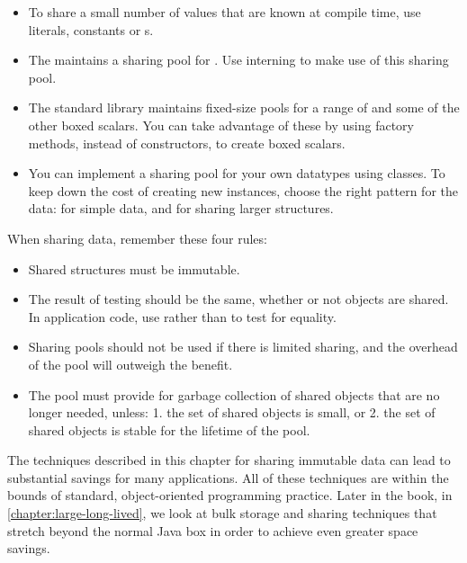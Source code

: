 \begin{itemize}
  \item To share a small number of values that are known at compile time, use
   literals,  constants or s.
  \item The \jre maintains a sharing
  pool for . Use  interning to make use of this
  sharing pool.
  \item The standard library maintains fixed-size pools for
   a range of  and some of the other boxed scalars. You
   can take advantage of these by using  factory methods, instead
   of constructors, to create boxed scalars.
   \item You can implement a sharing pool for your own datatypes using
    classes. To keep down the cost of creating new instances, choose
   the right pattern for the data:  for
   simple data, and  for sharing larger structures.
\end{itemize}

When sharing data, remember these four rules:
\begin{itemize}
  \item Shared structures must be immutable.
  \item The result of  testing should be the same, whether or
not objects are shared. In application code, use  rather than
\code{==} to test for equality.
  \item Sharing pools should not be used if there is limited sharing, and the
  overhead of the pool will outweigh the benefit.
  \item The pool must provide for garbage collection of shared objects
  that are no longer needed, unless: 1. the set of shared objects is
  small, or 2. the set of shared objects is stable for the lifetime of the
  pool.
\end{itemize}

The techniques described in this chapter for sharing immutable
data can lead to substantial savings for many applications.  All of these
techniques are within the bounds of standard, object-oriented programming
practice. Later in the book, in \autoref{chapter:large-long-lived}, we look at
bulk storage and sharing techniques that stretch beyond the normal Java box in
order to achieve even greater space savings. 






